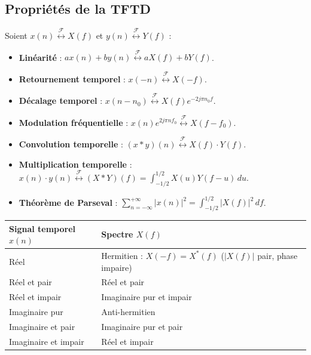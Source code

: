 \subsection{Propriétés de la TFTD}

\begin{prop}
    Soient $x(n) \overset{\mathcal{F}}{\longleftrightarrow} X(f)$ et $y(n) \overset{\mathcal{F}}{\longleftrightarrow} Y(f)$ :
    \begin{itemize}
        \item \textbf{Linéarité} : $a x(n) + b y(n) \overset{\mathcal{F}}{\longleftrightarrow} a X(f) + b Y(f)$.
        \item \textbf{Retournement temporel} : $x(-n) \overset{\mathcal{F}}{\longleftrightarrow} X(-f)$.
        \item \textbf{Décalage temporel} : $x(n - n_0) \overset{\mathcal{F}}{\longleftrightarrow} X(f) e^{-2j \pi n_0 f}$.
        \item \textbf{Modulation fréquentielle} : $x(n) e^{2j \pi n f_0} \overset{\mathcal{F}}{\longleftrightarrow} X(f - f_0)$.
        \item \textbf{Convolution temporelle} : $(x * y)(n) \overset{\mathcal{F}}{\longleftrightarrow} X(f) \cdot Y(f)$.
        \item \textbf{Multiplication temporelle} : $x(n) \cdot y(n) \overset{\mathcal{F}}{\longleftrightarrow} (X * Y)(f) = \int_{-1/2}^{1/2} X(u) Y(f - u) \, du$.
        \item \textbf{Théorème de Parseval} : $\sum_{n=-\infty}^{+\infty} |x(n)|^2 = \int_{-1/2}^{1/2} |X(f)|^2 \, df$.
    \end{itemize}
\end{prop}

\begin{proposition}
    \begin{center}
        \renewcommand{\arraystretch}{1.3}
        \begin{tabular}{ll}
            \toprule
            \textbf{Signal temporel} $x(n)$ & \textbf{Spectre} $X(f)$ \\
            \midrule
            Réel & Hermitien : $X(-f) = X^*(f)$ ($|X(f)|$ pair, phase impaire) \\
            Réel et pair & Réel et pair \\
            Réel et impair & Imaginaire pur et impair \\
            Imaginaire pur & Anti-hermitien \\
            Imaginaire et pair & Imaginaire pur et pair \\
            Imaginaire et impair & Réel et impair \\
            \bottomrule
        \end{tabular}
    \end{center}
\end{proposition}

